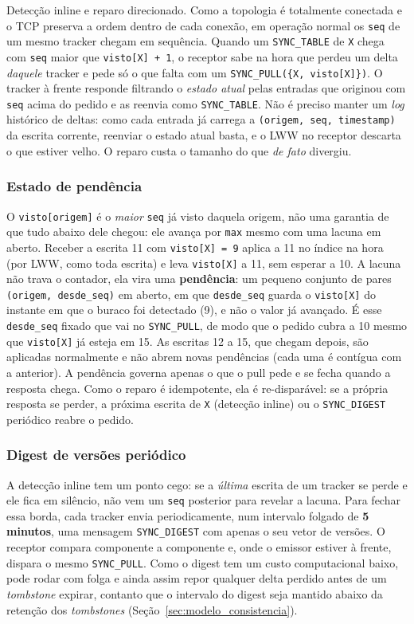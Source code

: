 \documentclass[12pt, a4paper]{article}
\begin{document}
Detecção inline e reparo direcionado. Como a topologia é totalmente conectada e o TCP preserva a ordem dentro de cada conexão, em operação normal os \texttt{seq} de um mesmo tracker chegam em sequência. Quando um \texttt{SYNC\_TABLE} de \texttt{X} chega com \texttt{seq} maior que \texttt{visto[X]\,+\,1}, o receptor sabe na hora que perdeu um delta \textit{daquele} tracker e pede só o que falta com um \texttt{SYNC\_PULL(\{X, visto[X]\})}. O tracker à frente responde filtrando o \textit{estado atual} pelas entradas que originou com \texttt{seq} acima do pedido e as reenvia como \texttt{SYNC\_TABLE}. Não é preciso manter um \textit{log} histórico de deltas: como cada entrada já carrega a \texttt{(origem, seq, timestamp)} da escrita corrente, reenviar o estado atual basta, e o LWW no receptor descarta o que estiver velho. O reparo custa o tamanho do que \textit{de fato} divergiu.

\subsubsection*{Estado de pendência}
 O \texttt{visto[origem]} é o \textit{maior} \texttt{seq} já visto daquela origem, não uma garantia de que tudo abaixo dele chegou: ele avança por \texttt{max} mesmo com uma lacuna em aberto. Receber a escrita 11 com \texttt{visto[X]\,=\,9} aplica a 11 no índice na hora (por LWW, como toda escrita) e leva \texttt{visto[X]} a 11, sem esperar a 10. A lacuna não trava o contador, ela vira uma \textbf{pendência}: um pequeno conjunto de pares \texttt{(origem, desde\_seq)} em aberto, em que \texttt{desde\_seq} guarda o \texttt{visto[X]} do instante em que o buraco foi detectado (9), e não o valor já avançado. É esse \texttt{desde\_seq} fixado que vai no \texttt{SYNC\_PULL}, de modo que o pedido cubra a 10 mesmo que \texttt{visto[X]} já esteja em 15. As escritas 12 a 15, que chegam depois, são aplicadas normalmente e não abrem novas pendências (cada uma é contígua com a anterior). A pendência governa apenas o que o pull pede e se fecha quando a resposta chega. Como o reparo é idempotente, ela é re-disparável: se a própria resposta se perder, a próxima escrita de \texttt{X} (detecção inline) ou o \texttt{SYNC\_DIGEST} periódico reabre o pedido.

\subsubsection*{Digest de versões periódico}
A detecção inline tem um ponto cego: se a \textit{última} escrita de um tracker se perde e ele fica em silêncio, não vem um \texttt{seq} posterior para revelar a lacuna. Para fechar essa borda, cada tracker envia periodicamente, num intervalo folgado de \textbf{5 minutos}, uma mensagem \texttt{SYNC\_DIGEST} com apenas o seu vetor de versões. O receptor compara componente a componente e, onde o emissor estiver à frente, dispara o mesmo \texttt{SYNC\_PULL}. Como o digest tem um custo computacional baixo, pode rodar com folga e ainda assim repor qualquer delta perdido antes de um \textit{tombstone} expirar, contanto que o intervalo do digest seja mantido abaixo da retenção dos \textit{tombstones} (Seção~\ref{sec:modelo_consistencia}).
\end{document}
